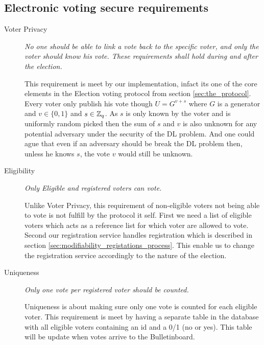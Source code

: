 \subsection{Electronic voting secure requirements} \label{sec:analyzing_electronic_voting_secure_requirements}
\begin{description}
    \item[Voter Privacy]
        \textit{No one should be able to link a vote back to the specific voter, and only the voter should
        know his vote. These requirements shall hold during and after the election.}  
        
        This requirement is meet by our implementation, infact its one of the core elements in the
        Election voting protocol from section \ref{sec:the_protocol}. Every voter only publish his vote
        though $U = G^{v+s}$ where $G$ is a generator and $v \in \{0,1\}$ and $s \in \mathbb{Z}_q$. As $s$ is only
        known by the voter and is uniformly random picked then the sum of $s$ and $v$ is also unknown for any 
        potential adversary under the security of the DL problem. And one could ague that even if an
        adversary should be break the DL problem then, unless he knows $s$, the vote $v$ would still
        be unknown.
        
    \item[Eligibility]
        \textit{Only Eligible and registered voters can vote.}    
        
        Unlike Voter Privacy, this requirement of non-eligible voters not being able to vote is not
        fulfill by the protocol it self. First we need a list of eligible voters which acts as a reference list for which voter are allowed to vote. Second our registration service handles registration which is described in
        section  \ref{sec:modifiability_registations_process}. This enable us to change the registration service 
        accordingly to the nature of the election.   
      
        
    \item[Uniqueness]
        \textit{Only one vote per registered voter should be counted.}
        
        Uniqueness is about making sure only one vote is counted for each eligible
        voter. This requirement is meet by having a separate table in the database with all eligible voters 
        containing an id and a 0/1 (no or yes). This table will be update when votes arrive to the Bulletinboard. 
        

\end{description}

